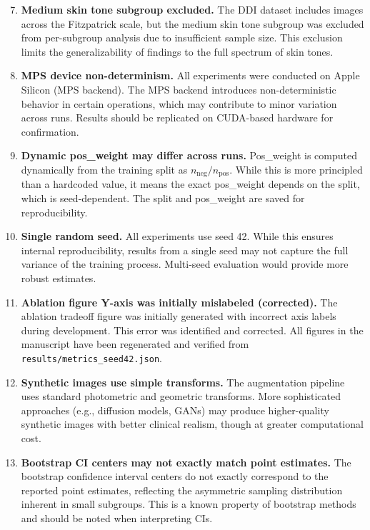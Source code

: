 \begin{enumerate}
    \setcounter{enumi}{6}
    \item \textbf{Medium skin tone subgroup excluded.} The DDI dataset includes images across the Fitzpatrick scale, but the medium skin tone subgroup was excluded from per-subgroup analysis due to insufficient sample size. This exclusion limits the generalizability of findings to the full spectrum of skin tones.

    \item \textbf{MPS device non-determinism.} All experiments were conducted on Apple Silicon (MPS backend). The MPS backend introduces non-deterministic behavior in certain operations, which may contribute to minor variation across runs. Results should be replicated on CUDA-based hardware for confirmation.

    \item \textbf{Dynamic pos\_weight may differ across runs.} Pos\_weight is computed dynamically from the training split as $n_{\text{neg}}/n_{\text{pos}}$. While this is more principled than a hardcoded value, it means the exact pos\_weight depends on the split, which is seed-dependent. The split and pos\_weight are saved for reproducibility.

    \item \textbf{Single random seed.} All experiments use seed 42. While this ensures internal reproducibility, results from a single seed may not capture the full variance of the training process. Multi-seed evaluation would provide more robust estimates.

    \item \textbf{Ablation figure Y-axis was initially mislabeled (corrected).} The ablation tradeoff figure was initially generated with incorrect axis labels during development. This error was identified and corrected. All figures in the manuscript have been regenerated and verified from \texttt{results/metrics\_seed42.json}.

    \item \textbf{Synthetic images use simple transforms.} The augmentation pipeline uses standard photometric and geometric transforms. More sophisticated approaches (e.g., diffusion models, GANs) may produce higher-quality synthetic images with better clinical realism, though at greater computational cost.

    \item \textbf{Bootstrap CI centers may not exactly match point estimates.} The bootstrap confidence interval centers do not exactly correspond to the reported point estimates, reflecting the asymmetric sampling distribution inherent in small subgroups. This is a known property of bootstrap methods and should be noted when interpreting CIs.


\end{enumerate}
